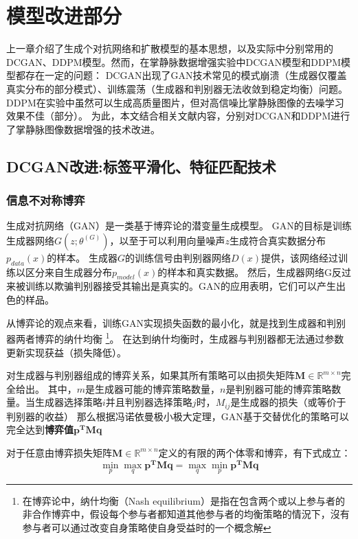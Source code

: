 \chapter{模型改进部分}

上一章介绍了生成个对抗网络和扩散模型的基本思想，以及实际中分别常用的DCGAN、DDPM模型。然而，在掌静脉数据增强实验中DCGAN模型和DDPM模型都存在一定的问题：
DCGAN出现了GAN技术常见的模式崩溃（生成器仅覆盖真实分布的部分模式）、训练震荡（生成器和判别器无法收敛到稳定均衡）问题。
DDPM在实验中虽然可以生成高质量图片，但对高信噪比掌静脉图像的去噪学习效果不佳（部分）。
为此，本文结合相关文献内容\cite{salimans2016improved}\cite{10323353}\cite{nichol2021improved}，分别对DCGAN和DDPM进行了掌静脉图像数据增强的技术改进。

\section{DCGAN改进:标签平滑化、特征匹配技术}

\subsection{信息不对称博弈}
生成对抗网络（GAN）\cite{goodfellow2014generative}是一类基于博弈论的潜变量生成模型。
GAN的目标是训练生成器网络$G(z;\theta^{(G)})$，以至于可以利用向量噪声$z$生成符合真实数据分布$p_{data}(x)$的样本。
生成器$G$的训练信号由判别器网络$D(x)$提供，该网络经过训练以区分来自生成器分布$p_{model}(x)$的样本和真实数据。
然后，生成器网络G反过来被训练以欺骗判别器接受其输出是真实的。GAN的应用表明，它们可以产生出色的样品\cite{denton2015deep}。

从博弈论的观点来看，训练GAN实现损失函数的最小化，就是找到生成器和判别器两者博弈的纳什均衡
\footnote{在博弈论中，纳什均衡（Nash equilibrium）是指在包含两个或以上参与者的非合作博弈中，假设每个参与者都知道其他参与者的均衡策略的情況下，沒有参与者可以通过改变自身策略使自身受益时的一个概念解}。
在达到纳什均衡时，生成器与判别器都无法通过参数更新实现获益（损失降低）。

对生成器与判别器组成的博弈关系，如果其所有策略可以由损失矩阵$\mathbf{M}\in\mathbb{R}^{m\times n}$完全给出。
其中，$m$是生成器可能的博弈策略数量，$n$是判别器可能的博弈策略数量。当生成器选择策略$i$并且判别器选择策略$j$时，$M_{ij}$是生成器的损失（或等价于判别器的收益）
那么根据冯诺依曼极小极大定理，GAN基于交替优化的策略可以完全达到\textbf{博弈值}$\mathbf{p^TMq}$

\begin{theorem}[Vonneumunn极小极大定理]
    \label{the:vonn}
    对于任意由博弈损失矩阵$\mathbf{M}\in\mathbb{R}^{m\times n}$定义的有限的两个体零和博弈，有下式成立：
    \[
    \underset{p}{\min}\underset{q}{\max}\mathbf{p^TMq}=\underset{q}{\max}\underset{p}{\min}\mathbf{p^TMq}
    \]
\end{theorem}

